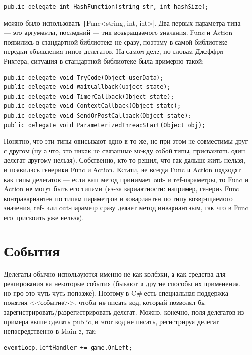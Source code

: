 \documentclass[a5paper]{article}
\begin{document}
\begin{verbatim}
public delegate int HashFunction(string str, int hashSize);
\end{verbatim}

можно было использовать \texttt|Func<string, int, int>|. Два первых параметра-типа --- это аргументы, последний --- тип возвращаемого значения. Func и Action появились в стандартной библиотеке не сразу, поэтому в самой библиотеке нередки объявления типов-делегатов. На самом деле, по словам Джеффри Рихтера, ситуация в стандартной библиотеке была примерно такой:

\begin{verbatim}
public delegate void TryCode(Object userData);
public delegate void WaitCallback(Object state);
public delegate void TimerCallback(Object state);
public delegate void ContextCallback(Object state);
public delegate void SendOrPostCallback(Object state);
public delegate void ParameterizedThreadStart(Object obj);
\end{verbatim}

Понятно, что эти типы описывают одно и то же, но при этом не совместимы друг с другом (ну а что, это никак не связанные между собой типы, присваивать один делегат другому нельзя). Собственно, кто-то решил, что так дальше жить нельзя, и появились генерики Func и Action. Кстати, не всегда Func и Action подходят как типы делегатов --- если ваш метод принимает out- и ref-параметры, то Func и Action не могут быть его типами (из-за вариантности: например, генерик Func контравариантен по типам параметров и ковариантен по типу возвращаемого значения, ref- или out-параметр сразу делает метод инвариантным, так что в Func его присвоить уже нельзя).

\section{События}

Делегаты обычно используются именно не как колбэки, а как средства для реагирования на некоторые события (бывают и другие способы их применения, но про это чуть-чуть попозже). Поэтому в C\# есть специальная поддержка понятия <<событие>>, чтобы не писать код, который позволял бы зарегистрировать/разрегистрировать делегат. Можно, конечно, поля делегатов из примера выше сделать public, и этот код не писать, регистрируя делегат непосредственно в Main-е, так:

\begin{verbatim}
eventLoop.leftHandler += game.OnLeft;
\end{verbatim}
\end{document}
